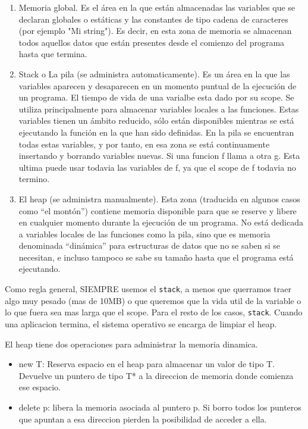 \documentclass[11pt]{article}
\begin{document}
\begin{enumerate}
    \item Memoria global.
        Es el área en la que están almacenadas las variables
        que se declaran globales o estáticas y las constantes de tipo cadena de caracteres (por ejemplo "Mi string").
        Es decir, en esta zona de memoria se almacenan todos aquellos datos que
        están presentes desde el comienzo del programa hasta que termina.
    \item Stack o La pila (se administra automaticamente).
        Es un área en la que las variables aparecen y desaparecen en un momento
        puntual de la ejecución de un programa.
        El tiempo de vida de una varialbe esta dado por su scope.
        Se utiliza principalmente para almacenar variables locales a las funciones.
        Estas variables tienen un ámbito reducido, sólo están disponibles mientras
        se está ejecutando la función en la que han sido definidas.
        En la pila se encuentran todas estas variables, y por tanto, en esa zona
        se está continuamente insertando y borrando variables nuevas.
        Si una funcion f llama a otra g. Esta ultima puede usar todavia las variables de
        f, ya que el scope de f todavia no termino.
    \item El heap (se administra manualmente).
        Esta zona (traducida en algunos casos como “el montón”) contiene memoria
        disponible para que se reserve y libere en cualquier momento durante la
        ejecución de un programa.
        No está dedicada a variables locales de las funciones como la pila, sino
        que es memoria denominada “dinámica” para estructuras de datos que no se
        saben si se necesitan, e incluso tampoco se sabe su tamaño hasta que el
        programa está ejecutando.
\end{enumerate}

Como regla general, SIEMPRE usemos el \texttt{stack}, a menos que querramos traer
algo muy pesado (mas de 10MB) o que queremos que la vida util de la variable o
lo que fuera sea mas larga que el scope.
Para el resto de los casos, \texttt{stack}.
Cuando una aplicacion termina, el sistema operativo se encarga de limpiar el heap.

El heap tiene dos operaciones para administrar la memoria dinamica.
\begin{itemize}
    \item new T: Reserva espacio en el heap para almacenar un valor
        de tipo T. Devuelve un puntero de tipo T* a la direccion de memoria
        donde comienza ese espacio.
    \item delete p: libera la memoria asociada al puntero p.
        Si borro todos los punteros que apuntan a esa direccion pierden la posibilidad
        de acceder a ella.
\end{itemize}
\end{document}
